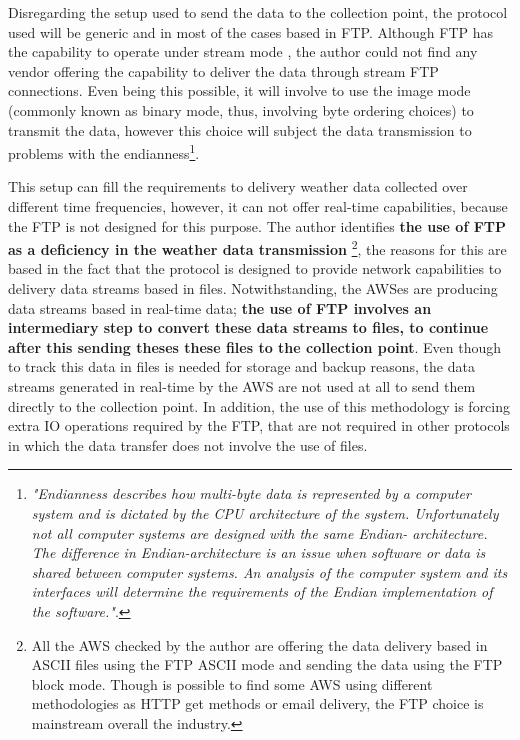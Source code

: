 Disregarding the setup used to send the data to the collection point, the protocol used will be generic and in most of the cases based in \gls{FTP}. Although \gls{FTP} has the capability to operate under stream mode \cite{rfc959}, the author could not find any vendor offering the capability to deliver the data through stream \gls{FTP} connections. Even being this possible, it will involve to use the image mode (commonly known as binary mode, thus, involving byte ordering choices) to transmit the data, however this choice will subject the data transmission to problems with the endianness\footnote{\emph{"Endianness describes how multi-byte data is represented by a computer system and is dictated by the CPU architecture of the system. Unfortunately not all computer systems are designed with the same Endian- architecture. The difference in Endian-architecture is an issue when software or data is shared between computer systems. An analysis of the computer system and its interfaces will determine the requirements of the Endian implementation of the software."\cite{endianness}}.}.

This setup can fill the requirements to delivery weather data collected over different time frequencies, however, it can not offer real-time capabilities, because the \gls{FTP} is not designed for this purpose. The author identifies \textbf{the use of FTP as a deficiency in the weather data transmission} \footnote{All the \gls{AWS} checked by the author are offering the data delivery based in \gls{ASCII} files using the \gls{FTP} \gls{ASCII} mode and sending the data using the \gls{FTP} block mode. Though is possible to find some \gls{AWS} using different methodologies as \gls{HTTP} get methods or email delivery, the FTP choice is mainstream overall the industry.}, the reasons for this are based in the fact that the protocol is designed to provide network capabilities to delivery data streams based in files. Notwithstanding, the \gls{AWS}es are producing data streams based in real-time data; \textbf{the use of FTP involves an intermediary step to convert these data streams to files, to continue after this sending theses these files to the collection point}. Even though to track this data in files is needed for storage and backup reasons, the data streams  generated in real-time by the \gls{AWS} are not used at all to send them directly to the collection point. In addition, the use of this methodology is forcing extra \gls{IO} operations required by the \gls{FTP}, that are not required in other protocols in which the data transfer does not involve the use of files.

